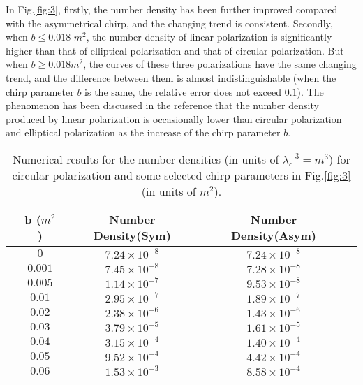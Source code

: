 \documentclass[aps,preprint,superscriptaddress]{revtex4}
\begin{document}
In Fig.\ref{fig:3}, firstly, the number density has been further improved compared with the asymmetrical chirp, and the changing trend is consistent. Secondly, when $b\le 0.018$ $m^2$, the number density of linear polarization is significantly higher than that of elliptical polarization and that of circular polarization. But when $b\ge 0.018$$m^2$, the curves of these three polarizations have the same changing trend, and the difference between them is almost indistinguishable (when the chirp parameter $b$ is the same, the relative error does not exceed $0.1$). The phenomenon has been discussed in the reference \cite{He:2012ed} that the number density produced by linear polarization is occasionally lower than circular polarization and elliptical polarization as the increase of the chirp parameter $b$.

\begin{table}[htbp]
\caption{Numerical results for the number densities (in units of $\lambda_{c}^{-3}=m^3$)
for circular polarization and some selected chirp parameters in Fig.\ref{fig:3} (in units of $m^2$).}
\centering
\begin{tabular}{ccccc}
\hline
& b ($m^2$) & Number Density(Sym) & Number Density(Asym) \\
\hline
& $0$ &$7.24\times10^{-8}$ & $7.24 \times 10^{-8}$ \\

& $0.001$ &$7.45\times10^{-8}$ & $7.28 \times 10^{-8}$ \\
& $0.005$ &$1.14\times10^{-7}$ & $9.53 \times 10^{-8}$ \\

& $0.01$ &$2.95\times10^{-7}$ & $1.89 \times 10^{-7}$ \\

& $0.02$ &$2.38\times10^{-6}$ & $1.43 \times 10^{-6}$ \\

& $0.03$ &$3.79\times10^{-5}$ & $1.61 \times 10^{-5}$ \\

& $0.04$ &$3.15\times10^{-4}$ & $1.40 \times 10^{-4}$ \\

& $0.05$ &$9.52\times10^{-4}$ & $4.42 \times 10^{-4}$ \\

& $0.06$ &$1.53\times10^{-3}$ & $8.58 \times 10^{-4}$ \\
\hline
\end{tabular}
\label{tab:1}
\vskip8pt
\end{table}
\end{document}

